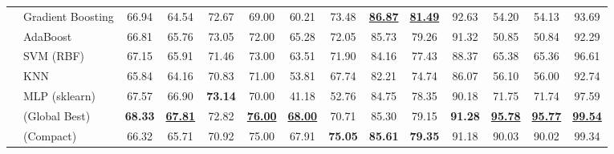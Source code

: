 \begin{table}[t]
\begin{tabular}{ll ccc ccc ccc ccc}
 & Gradient Boosting & 66.94 & 64.54 & 72.67 & 69.00 & 60.21 & 73.48 & \underline{\textbf{86.87}} & \underline{\textbf{81.49}} & 92.63 & 54.20 & 54.13 & 93.69 \\
 & AdaBoost & 66.81 & 65.76 & 73.05 & 72.00 & 65.28 & 72.05 & 85.73 & 79.26 & 91.32 & 50.85 & 50.84 & 92.29 \\
\midrule
{} & SVM (RBF) & 67.15 & 65.91 & 71.46 & 73.00 & 63.51 & 71.90 & 84.16 & 77.43 & 88.37 & 65.38 & 65.36 & 96.61 \\
 & KNN & 65.84 & 64.16 & 70.83 & 71.00 & 53.81 & 67.74 & 82.21 & 74.74 & 86.07 & 56.10 & 56.00 & 92.74 \\
 & MLP (sklearn) & 67.57 & 66.90 & \textbf{73.14} & 70.00 & 41.18 & 52.76 & 84.75 & 78.35 & 90.18 & 71.75 & 71.74 & 97.59 \\
 & \modelname{} (Global Best) & \textbf{68.33} & \underline{\textbf{67.81}} & 72.82 & \underline{\textbf{76.00}} & \underline{\textbf{68.00}} & 70.71 & 85.30 & 79.15 & \textbf{91.28} & \underline{\textbf{95.78}} & \underline{\textbf{95.77}} & \underline{\textbf{99.54}} \\
 & \modelname{} (Compact) & 66.32 & 65.71 & 70.92 & 75.00 & 67.91 & \textbf{75.05} & \textbf{85.61} & \textbf{79.35} & 91.18 & 90.03 & 90.02 & 99.34 \\
\bottomrule
\end{tabular}
\end{table}
